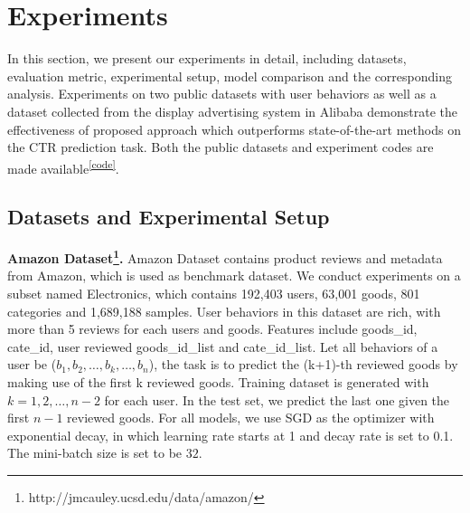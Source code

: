 \section{Experiments} \label{exp}

In this section, we present our experiments in detail, including datasets, evaluation metric, experimental setup, model comparison and the corresponding analysis.
Experiments on two public datasets with user behaviors as well as a dataset collected from the display advertising system in Alibaba demonstrate the effectiveness of proposed approach which outperforms state-of-the-art methods on the CTR prediction task.
Both the public datasets and experiment codes are made available\textsuperscript{\ref{code}}.%

\subsection{Datasets and Experimental Setup}
\textbf{Amazon Dataset\footnote{http://jmcauley.ucsd.edu/data/amazon/}.} 
Amazon Dataset contains product reviews and metadata from Amazon, which is used as benchmark dataset\cite{Amazon:AUC,AmazonData,ICCV_Amazon}. We conduct experiments on a subset named Electronics, which contains 192,403 users, 63,001 goods, 801 categories and 1,689,188 samples. User behaviors in this dataset are rich, with more than 5 reviews for each users and goods. Features include goods\_id, cate\_id, user reviewed goods\_id\_list and cate\_id\_list. Let all behaviors of a user be ($b_1, b_2, \ldots, b_k, \ldots, b_n$), the task is to predict the (k+1)-th reviewed goods by making use of the first k reviewed goods. 
    Training dataset is generated with $k = 1, 2, \ldots, n - 2$ for each user. In the test set, we predict the last one given the first $n-1$ reviewed goods. 
    For all models, we use SGD as the optimizer with exponential decay, in which learning rate starts at 1 and decay rate is set to 0.1. %
    The mini-batch size is set to be $32$.

